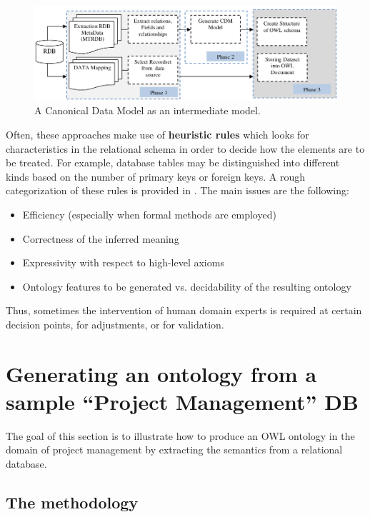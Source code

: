 \documentclass[11pt]{llncs}
\newcommand{\labelsec}[1]{\label{sec:#1}}
\begin{document}
\begin{figure}[H]
 \centering
 \includegraphics[scale = 0.45]{img/methodology1.png}
 \caption{A Canonical Data Model as an intermediate model.}
 \label{fig:intermediate}
\end{figure} 

 Often, these approaches make use of \textbf{heuristic rules} which looks for characteristics in the relational schema 
  in order to decide how the elements are to be treated. For example, database tables may be distinguished into
   different kinds based on the number of primary keys or foreign keys. A rough categorization of these rules 
   is provided in \cite{bringingRDBS}. The main issues are the following:
\begin{itemize}
 \item Efficiency (especially when formal methods are employed)
 \item Correctness of the inferred meaning
 \item Expressivity with respect to high-level axioms
 \item Ontology features to be generated vs. decidability of the resulting ontology
\end{itemize}
   
  Thus, sometimes the intervention of human domain experts is required 
  at certain decision points, for adjustments, or for validation.
  
  
\section{Generating an ontology from a sample ``Project Management'' DB}
\labelsec{inaction}

The goal of this section is to illustrate how to produce an OWL ontology in the domain of project management 
 by extracting the semantics from a relational database.

\subsection{The methodology}
\end{document}
